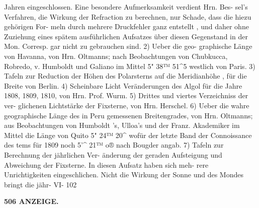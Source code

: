 \documentclass[12pt,a4paper]{article}
\begin{document}
Jahren  eingeschlossen.  Eine  besondere  Aufmerksamkeit  verdient  Hrn.  Bes- sel's  Verfahren,  die  Wirkung  der  Refraction  zu  berechnen,  nur  Schade,  dass  die  hiezu  gehörigen  For- meln durch  mehrere  Druckfehler  ganz  entstellt ,  und  daher  ohne  Zuziehung  eines  spätem  ausführlichen Aufsatzes  über  diesen  Gegenstand  in  der  Mon.  Corresp.  gar  nicht  zu  gebrauchen  sind.  2)  Ueber  die  geo- graphische Länge  von  Havanna,  von  Hrn.  Oltmanns;  nach  Beobachtungen  von  Chubkucca,  Robredo,  v. Humboldt  und  Galiano  im  Mittel  5"  38™  51\textasciicircum{}5  westlich  von  Paris.  3)  Tafeln  zur  Reduction  der  Höhen des  Polarsterns  auf  die  Meridianhöhe ,  für  die  Breite  von  Berlin.  4)  Scheinbare  Licht  Veränderungen  des Algol  für  die  Jahre  1808,  1809,  1810,  von  Hrn.  Prof.  Wurm.  5)  Drittes  und  viertes  Verzeichniss  der  ver- glichenen Lichtstärke  der  Fixsterne,  von  Hrn.  Herschel.  6)  Ueber  die  wahre  geographische  Länge  des in  Peru  gemessenen  Breitengrades,  von  Hrn.  Oltmanns;  aus  Beobachtungen  von  Humboldt 's,  Ulloa's  und der  Franz.  Akademiker  im  Mittel  die  Länge  von  Quito  5"  24™  20\textasciicircum{}  wofür  der  letzte  Band  der  Connoissance des  tems  für  1809  noch  5'\textasciicircum{}  21™  o®  nach  Bougder  angab.  7)  Tafeln  zur  Berechnung  der  jährlichen  Ver- änderung der  geraden  Aufsteigung  und  Abweichung  der  Fixsterne.  In  diesen  Aufsatz  haben  sich  meh- rere Unrichtigkeiten  eingeschlichen.     Nicht  die  Wirkung   der  Sonne   und    des  Mondes  bringt  die  jähr- VI-  102

\vspace{0.5em}


\noindent\textbf{506  ANZEIGE.}
\end{document}
